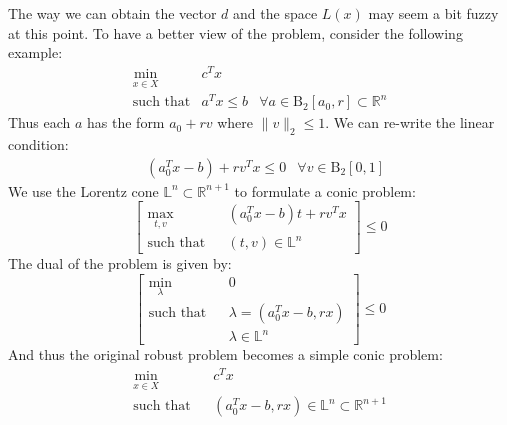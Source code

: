 The way we can obtain the vector $d$ and the space $L(x)$ may seem a bit fuzzy at this point. To have a better view of the problem, consider the following example:
\begin{eqnarray*}
\min_{x\in X} & c^Tx\\
\text{such that} &  a^Tx \leq b & \forall a\in \mathrm{B}_2[a_0,r] \subset \mathbb{R}^n
\end{eqnarray*}
Thus each $a$ has the form $a_0 + rv$ where $\|v\|_2 \leq 1$. We can re-write the linear condition:
\begin{eqnarray*}
& (a_0^Tx - b) + rv^Tx \leq 0 & \forall v\in \mathrm{B}_2[0,1] 
\end{eqnarray*}
We use the Lorentz cone $\mathbb{L}^n \subset \mathbb{R}^{n+1}$ to formulate a conic problem:
\begin{equation*}
\left[ \begin{array}{rcl}
\max\limits_{t,v} & & (a_0^Tx - b)t + rv^Tx \\
\text{such that}& &  (t,v)\in \mathbb{L}^n 
\end{array}
\right] \leq 0
\end{equation*}
The dual of the problem is given by:
\begin{equation*}
\left[ \begin{array}{rcl} 
\min\limits_{\lambda} & & 0 \\
\text{such that} & & \lambda = (a_0^Tx - b,rx)\\
& &  \lambda\in \mathbb{L}^n 
\end{array}
 \right] \leq 0
\end{equation*}
And thus the original robust problem becomes a simple conic problem:
\begin{eqnarray*}
\min_{x\in X} & & c^Tx \\
\text{such that} & &  (a_0^Tx - b,rx) \in \mathbb{L}^n \subset \mathbb{R}^{n+1}
\end{eqnarray*}



%
%
